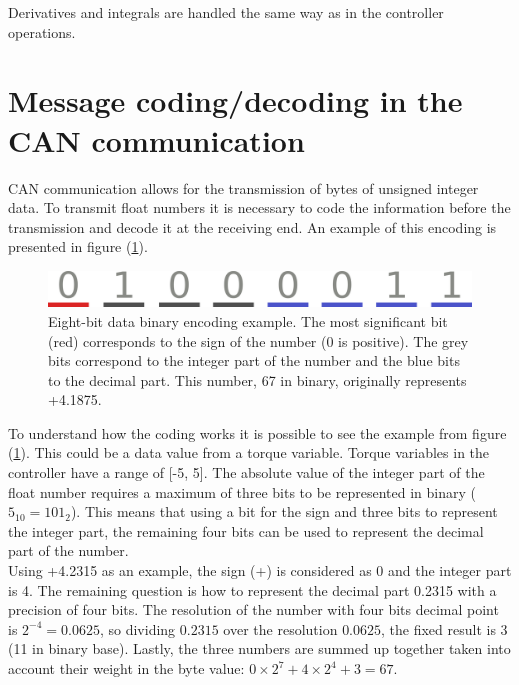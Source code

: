 \documentclass[table,xcdraw]{article}
\begin{document}
Derivatives and integrals are handled the same way as in the controller operations. 


\newpage
\section{Message coding/decoding in the CAN communication}\label{app:float2uint8}

CAN communication allows for the transmission of bytes of unsigned integer data. To transmit float numbers it is necessary to code the information before the transmission and decode it at the receiving end. An example of this encoding is presented in figure (\ref{fig:coding}).

\begin{figure}[h!]
    \centering
    \includegraphics[width=\textwidth]{figures/coding.png}
    \caption{Eight-bit data binary encoding example. The most significant bit (red) corresponds to the sign of the number (0 is positive). The grey bits correspond to the integer part of the number and the blue bits to the decimal part. This number, 67 in binary, originally represents +4.1875.}
    \label{fig:coding}
\end{figure}

To understand how the coding works it is possible to see the example from figure (\ref{fig:coding}). This could be a data value from a torque variable. Torque variables in the controller have a range of [-5, 5]. The absolute value of the integer part of the float number requires a maximum of three bits to be represented in binary ($5_{10} = 101_2$). This means that using a bit for the sign and three bits to represent the integer part, the remaining four bits can be used to represent the decimal part of the number.\\

Using +4.2315 as an example, the sign (+) is considered as 0 and the integer part is 4. The remaining question is how to represent the decimal part 0.2315 with a precision of four bits. The resolution of the number with four bits decimal point is $2^{-4} = 0.0625$, so dividing $0.2315$ over the resolution $0.0625$, the fixed result is 3 (11 in binary base). Lastly, the three numbers are summed up together taken into account their weight in the byte value: $0 \times 2^{7} + 4 \times 2^4 + 3 = 67$.\\
\end{document}
